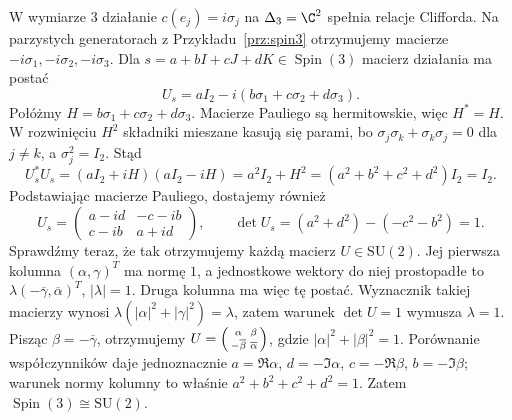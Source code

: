 \begin{przyklad}
\label{prz:bloch}
W wymiarze $3$ działanie
$c(e_j)=i\sigma_j$ na $\Delta_3=\C^2$
spełnia relacje Clifforda. Na parzystych
generatorach z Przykładu~\ref{prz:spin3}
otrzymujemy macierze $-i\sigma_1,-i\sigma_2,
-i\sigma_3$. Dla
$s=a+bI+cJ+dK\in\operatorname{Spin}(3)$
macierz działania ma postać
\[
 U_s=aI_2-i(b\sigma_1+c\sigma_2+d\sigma_3).
\]
Połóżmy $H=b\sigma_1+c\sigma_2+d\sigma_3$.
Macierze Pauliego są hermitowskie, więc $H^*=H$.
W rozwinięciu $H^2$ składniki mieszane kasują się parami,
bo $\sigma_j\sigma_k+\sigma_k\sigma_j=0$ dla $j\ne k$,
a $\sigma_j^2=I_2$. Stąd
\[
 U_s^*U_s=(aI_2+iH)(aI_2-iH)
 =a^2I_2+H^2=(a^2+b^2+c^2+d^2)I_2=I_2.
\]
Podstawiając macierze Pauliego, dostajemy również
\[
 U_s=\begin{pmatrix}a-id&-c-ib\\c-ib&a+id\end{pmatrix},
 \qquad
 \det U_s=(a^2+d^2)-(-c^2-b^2)=1.
\]
Sprawdźmy teraz, że tak otrzymujemy każdą macierz $U\in\mathrm{SU}(2)$.
Jej pierwsza kolumna $(\alpha,\gamma)^T$ ma normę $1$,
a jednostkowe wektory do niej prostopadłe to
$\lambda(-\overline\gamma,\overline\alpha)^T$, $|\lambda|=1$.
Druga kolumna ma więc tę postać. Wyznacznik takiej macierzy
wynosi $\lambda(|\alpha|^2+|\gamma|^2)=\lambda$,
zatem warunek $\det U=1$ wymusza $\lambda=1$.
Pisząc $\beta=-\overline\gamma$, otrzymujemy
$U=\begin{psmallmatrix}\alpha&\beta\\
-\overline\beta&\overline\alpha\end{psmallmatrix}$,
gdzie $|\alpha|^2+|\beta|^2=1$.
Porównanie współczynników daje jednoznacznie
$a=\Re\alpha$, $d=-\Im\alpha$,
$c=-\Re\beta$, $b=-\Im\beta$;
warunek normy kolumny to właśnie $a^2+b^2+c^2+d^2=1$.
Zatem $\operatorname{Spin}(3)\cong\mathrm{SU}(2)$.


\end{przyklad}
